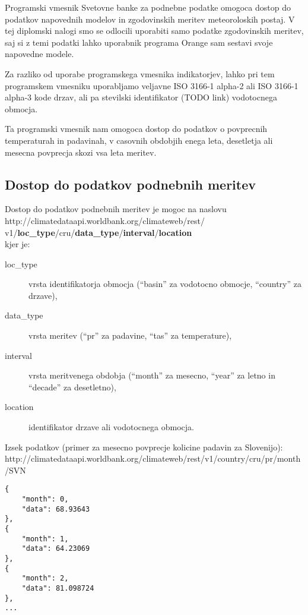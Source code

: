 Programski vmesnik Svetovne banke za podnebne podatke omogoca dostop do 
podatkov napovednih modelov in zgodovinskih meritev meteoroloskih postaj. V tej 
diplomski nalogi smo se odlocili uporabiti samo podatke zgodovinskih meritev, 
saj si z temi podatki lahko uporabnik programa Orange sam sestavi svoje 
napovedne modele.

Za razliko od uporabe programskega vmesnika indikatorjev, lahko pri tem
programskem vmesniku uporabljamo veljavne ISO 3166-1 alpha-2 ali ISO 3166-1 
alpha-3 kode drzav, ali pa stevilski identifikator (TODO link) vodotocnega 
obmocja.

Ta programski vmesnik nam omogoca dostop do podatkov o povprecnih temperaturah 
in padavinah, v casovnih obdobjih enega leta, desetletja ali mesecna povprecja 
skozi vsa leta meritev.


\subsection{Dostop do podatkov podnebnih meritev}

Dostop do podatkov podnebnih meritev je mogoc na naslovu \\
http://climatedataapi.worldbank.org/climateweb/rest/\\
v1/\textbf{loc\_type}/cru/\textbf{data\_type}/\textbf{interval}/\textbf{location}\\
kjer je:
\begin{description}
\item [loc\_type] vrsta identifikatorja obmocja (``basin'' za vodotocno obmocje, 
  ``country'' za drzave),
\item [data\_type] vrsta meritev (``pr'' za padavine, ``tas'' za temperature),
\item [interval] vrsta meritvenega obdobja (``month'' za mesecno, ``year'' za letno in
  ``decade'' za desetletno),
\item [location] identifikator drzave ali vodotocnega obmocja.
\end{description}


Izsek podatkov (primer za mesecno povprecje kolicine padavin za Slovenijo):
http://climatedataapi.worldbank.org/climateweb/rest/v1/country/cru/pr/month/SVN

\begin{lstlisting}
{
    "month": 0,
    "data": 68.93643
},
{
    "month": 1,
    "data": 64.23069
},
{
    "month": 2,
    "data": 81.098724
},
...
\end{lstlisting}











